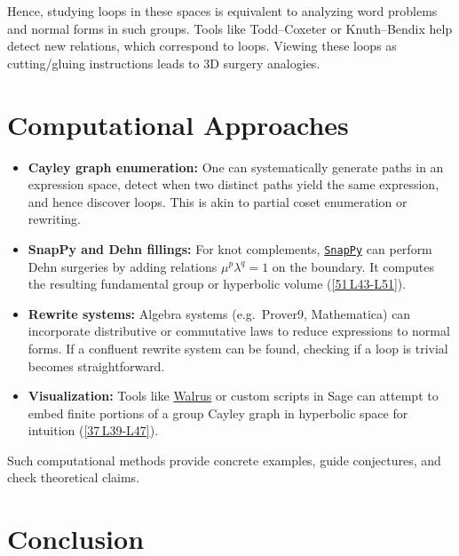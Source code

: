 \documentclass[11pt]{article}
\theoremstyle{remark}
\begin{document}
    Hence, studying loops in these spaces is equivalent to analyzing word problems and normal forms in such groups. Tools like Todd--Coxeter or Knuth--Bendix help detect new relations, which correspond to loops. Viewing these loops as cutting/gluing instructions leads to 3D surgery analogies.

    \bigskip

    \section{Computational Approaches}
    \label{sec:computation}

    \begin{itemize}[leftmargin=2em]
        \item \textbf{Cayley graph enumeration:} One can systematically generate paths in an expression space, detect when two distinct paths yield the same expression, and hence discover loops. This is akin to partial coset enumeration or rewriting.
        \item \textbf{SnapPy and Dehn fillings:} For knot complements, \href{https://snappy.computop.org/}{\texttt{SnapPy}} can perform Dehn surgeries by adding relations $\mu^p\lambda^q=1$ on the boundary. It computes the resulting fundamental group or hyperbolic volume (\href{https://arxiv.org/abs/math/9803087}{[51\,\textdagger L43-L51]}).
        \item \textbf{Rewrite systems:} Algebra systems (e.g.\ Prover9, Mathematica) can incorporate distributive or commutative laws to reduce expressions to normal forms. If a confluent rewrite system can be found, checking if a loop is trivial becomes straightforward.
        \item \textbf{Visualization:} Tools like \href{https://github.com/AdhocMan/computers_in_hyperbolic_geometry}{Walrus} or custom scripts in Sage can attempt to embed finite portions of a group Cayley graph in hyperbolic space for intuition (\href{https://blog.geometryteachersguide.com/visually-representing-infinite-cayley-graphs-in-the-hyperbolic-plane/}{[37\,\textdagger L39-L47]}).
    \end{itemize}

    Such computational methods provide concrete examples, guide conjectures, and check theoretical claims.

    \bigskip

    \section{Conclusion}
\end{document}
